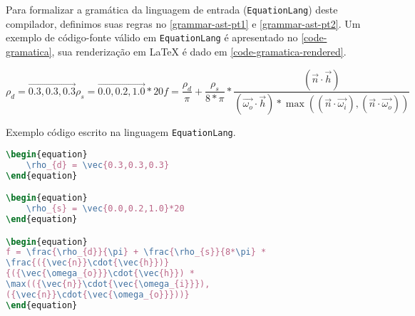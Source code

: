 Para formalizar a gramática da linguagem de entrada (\texttt{EquationLang}) deste compilador, definimos suas regras no \autoref{grammar-ast-pt1} e \autoref{grammar-ast-pt2}. Um exemplo de código-fonte válido em \texttt{EquationLang} é apresentado no \autoref{code-gramatica}, sua renderização em \LaTeX{} é dado em \autoref{code-gramatica-rendered}.

\label{code-gramatica-rendered} \begin{subequations}
\begin{equation}
    \rho_{d} = \vec{0.3,0.3,0.3}
\end{equation}
\begin{equation}
    \rho_{s} = \vec{0.0,0.2,1.0}*20
\end{equation}
\begin{equation}
f = \frac{\rho_{d}}{\pi} + \frac{\rho_{s}}{8*\pi} *
\frac{({\vec{n}}\cdot{\vec{h}})}
{({\vec{\omega_{o}}}\cdot{\vec{h}}) *
\max(({\vec{n}}\cdot{\vec{\omega_{i}}}),
({\vec{n}}\cdot{\vec{\omega_{o}}}))}
\end{equation}
\end{subequations}


\begin{codigo}[htb]
        \caption{\small Exemplo código escrito na linguagem \texttt{EquationLang}. }
        \label{code-gramatica}
\begin{lstlisting}[language=tex, frame=none]
\begin{equation}
    \rho_{d} = \vec{0.3,0.3,0.3}
\end{equation}

\begin{equation}
    \rho_{s} = \vec{0.0,0.2,1.0}*20
\end{equation}

\begin{equation}
f = \frac{\rho_{d}}{\pi} + \frac{\rho_{s}}{8*\pi} *
\frac{({\vec{n}}\cdot{\vec{h}})}
{({\vec{\omega_{o}}}\cdot{\vec{h}}) *
\max(({\vec{n}}\cdot{\vec{\omega_{i}}}),
({\vec{n}}\cdot{\vec{\omega_{o}}}))}
\end{equation}

\end{lstlisting}
\end{codigo}

